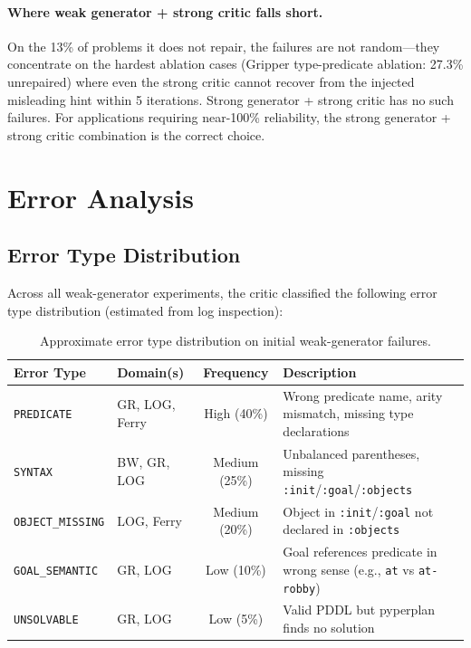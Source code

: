 \documentclass{article}
\begin{document}
\paragraph{Where weak generator + strong critic falls short.}
On the 13\% of problems it does not repair, the failures are not random---they
concentrate on the hardest ablation cases (Gripper type-predicate ablation: 27.3\%
unrepaired) where even the strong critic cannot recover from the injected misleading
hint within 5 iterations.  Strong generator + strong critic has no such failures.
For applications requiring near-100\% reliability, the strong generator + strong
critic combination is the correct choice.

\section{Error Analysis}
\label{sec:error_analysis}

\subsection{Error Type Distribution}
\label{sec:error_dist}

Across all weak-generator experiments, the critic classified the following error
type distribution (estimated from log inspection):

\begin{table}[h]
\centering
\caption{Approximate error type distribution on initial weak-generator failures.}
\label{tab:error_dist}
\begin{tabular}{llcp{7cm}}
\toprule
\textbf{Error Type} & \textbf{Domain(s)} & \textbf{Frequency} & \textbf{Description} \\
\midrule
\texttt{PREDICATE}      & GR, LOG, Ferry & High (40\%) & Wrong predicate name, arity mismatch, missing type declarations \\
\texttt{SYNTAX}         & BW, GR, LOG    & Medium (25\%) & Unbalanced parentheses, missing \texttt{:init}/\texttt{:goal}/\texttt{:objects} \\
\texttt{OBJECT\_MISSING}& LOG, Ferry     & Medium (20\%) & Object in \texttt{:init}/\texttt{:goal} not declared in \texttt{:objects} \\
\texttt{GOAL\_SEMANTIC} & GR, LOG        & Low (10\%)   & Goal references predicate in wrong sense (e.g., \texttt{at} vs \texttt{at-robby}) \\
\texttt{UNSOLVABLE}     & GR, LOG        & Low (5\%)    & Valid PDDL but pyperplan finds no solution \\
\bottomrule
\end{tabular}
\end{table}
\end{document}
